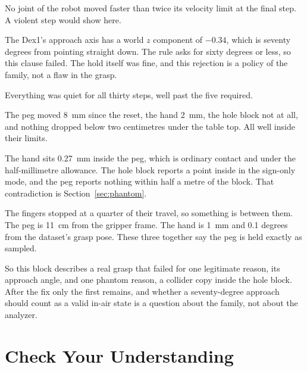 \begin{description}[leftmargin=1.6em, style=nextline]
\item[abnormal\_gripper\_state] No joint of the robot moved faster than twice its velocity limit at the final step. A violent step would show here.
\item[gripper\_orientation\_within\_range] The Dex1's approach axis has a world $z$ component of $-0.34$, which is seventy degrees from pointing straight down. The rule asks for sixty degrees or less, so this clause failed. The hold itself was fine, and this rejection is a policy of the family, not a flaw in the grasp.
\item[stability\_reached] Everything was quiet for all thirty steps, well past the five required.
\item[excessive\_pose\_deviation and pos\_below\_threshold] The peg moved 8~mm since the reset, the hand 2~mm, the hole block not at all, and nothing dropped below two centimetres under the table top. All well inside their limits.
\item[collision\_free] The hand sits 0.27~mm inside the peg, which is ordinary contact and under the half-millimetre allowance. The hole block reports a point inside in the sign-only mode, and the peg reports nothing within half a metre of the block. That contradiction is Section~\ref{sec:phantom}.
\item[fingers\_blocked, object\_near\_ee, at\_grasp\_pose] The fingers stopped at a quarter of their travel, so something is between them. The peg is 11~cm from the gripper frame. The hand is 1~mm and 0.1 degrees from the dataset's grasp pose. These three together say the peg is held exactly as sampled.
\end{description}

So this block describes a real grasp that failed for one legitimate reason, its approach angle, and one phantom reason, a collider copy inside the hole block. After the fix only the first remains, and whether a seventy-degree approach should count as a valid in-air state is a question about the family, not about the analyzer.

\section{Check Your Understanding}
\label{sec:check}


